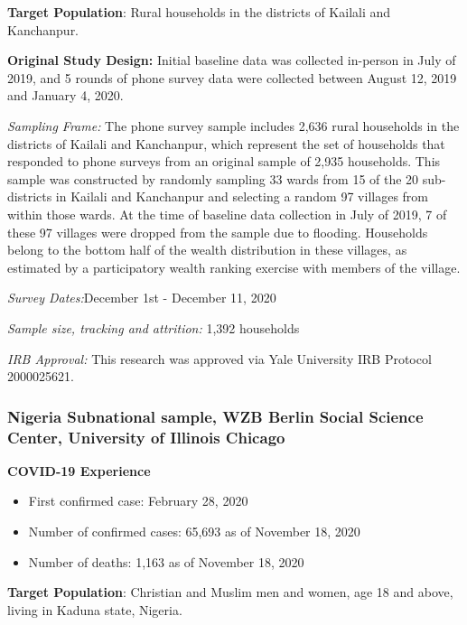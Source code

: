 \documentclass[
  12pt,
]{article}
\begin{document}
\textbf{Target Population}: Rural households in the districts of Kailali and Kanchanpur.

\textbf{Original Study Design:} Initial baseline data was collected in-person in July of 2019, and 5 rounds of phone survey data were collected between August 12, 2019 and January 4, 2020.

\emph{Sampling Frame:} The phone survey sample includes 2,636 rural households in the districts of Kailali and Kanchanpur, which represent the set of households that responded to phone surveys from an original sample of 2,935 households. This sample was constructed by randomly sampling 33 wards from 15 of the 20 sub-districts in Kailali and Kanchanpur and selecting a random 97 villages from within those wards. At the time of baseline data collection in July of 2019, 7 of these 97 villages were dropped from the sample due to flooding. Households belong to the bottom half of the wealth distribution in these villages, as estimated by a participatory wealth ranking exercise with members of the village.

\emph{Survey Dates:}December 1st - December 11, 2020

\emph{Sample size, tracking and attrition:} 1,392 households

\emph{IRB Approval:} This research was approved via Yale University IRB Protocol 2000025621.

\hypertarget{nigeria-subnational-sample-wzb-berlin-social-science-center-university-of-illinois-chicago}{%
\subsubsection*{Nigeria Subnational sample, WZB Berlin Social Science Center, University of Illinois Chicago}\label{nigeria-subnational-sample-wzb-berlin-social-science-center-university-of-illinois-chicago}}

\textbf{COVID-19 Experience}

\begin{itemize}
\item First confirmed case: February 28, 2020
\item Number of confirmed cases: 65,693 as of November 18, 2020 
\item Number of deaths:  1,163 as of November 18, 2020 
\end{itemize}

\textbf{Target Population}: Christian and Muslim men and women, age 18 and above, living in Kaduna state, Nigeria.
\end{document}
